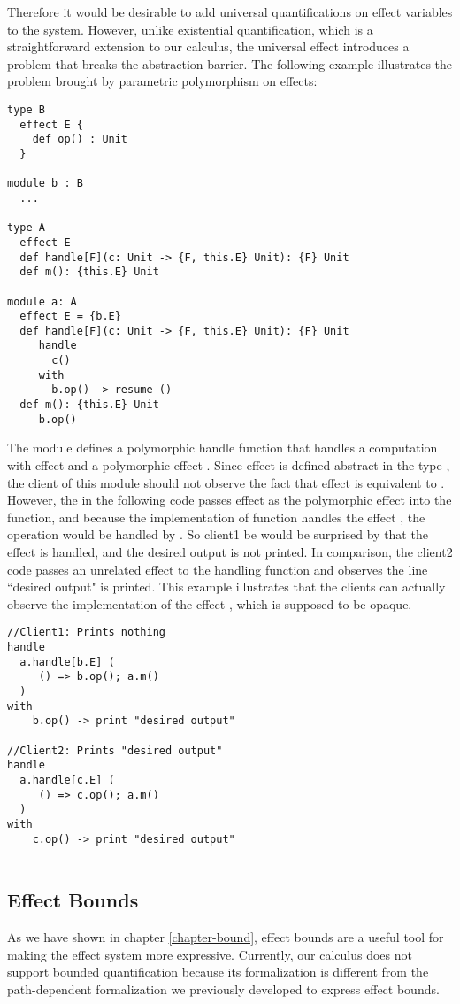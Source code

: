 Therefore it would be desirable to add universal quantifications on effect variables to the system. However, unlike existential quantification, which is a straightforward extension to our calculus, the universal effect introduces a problem that breaks the abstraction barrier. The following example illustrates the problem brought by parametric polymorphism on effects:

\begin{lstlisting}
type B
  effect E {
  	def op() : Unit
  }

module b : B
  ...

type A
  effect E 
  def handle[F](c: Unit -> {F, this.E} Unit): {F} Unit
  def m(): {this.E} Unit
  
module a: A
  effect E = {b.E}
  def handle[F](c: Unit -> {F, this.E} Unit): {F} Unit
     handle
       c()
     with
       b.op() -> resume ()
  def m(): {this.E} Unit
     b.op()
  \end{lstlisting}

The module  defines a polymorphic handle function that handles a computation with effect  and a polymorphic effect . Since effect  is defined abstract in the type , the client of this module should not observe the fact that effect  is equivalent to . However, the  in the following code passes effect  as the polymorphic effect into the  function, and because the implementation of   function handles the effect , the operation  would be handled by . So client1 be would be surprised by that the effect  is handled, and the desired output is not printed. In comparison, the client2 code passes an unrelated effect  to the handling function and observes the line ``desired output" is printed. This example illustrates that the clients can actually observe the implementation of the effect , which is supposed to be opaque.
\begin{lstlisting}
//Client1: Prints nothing
handle 
  a.handle[b.E] (
     () => b.op(); a.m()
  )
with
    b.op() -> print "desired output"

//Client2: Prints "desired output"
handle 
  a.handle[c.E] (
     () => c.op(); a.m()
  )
with
    c.op() -> print "desired output"
    
\end{lstlisting}


\subsection{Effect Bounds}
As we have shown in chapter \ref{chapter-bound}, effect bounds are a useful tool for making the effect system more expressive. Currently, our calculus does not support bounded quantification because its formalization is different from the path-dependent formalization we previously developed to express effect bounds. 

